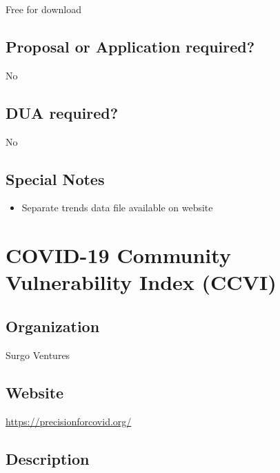 \documentclass[
]{book}
\providecommand{\tightlist}{%
  \setlength{\itemsep}{0pt}\setlength{\parskip}{0pt}}
\begin{document}
Free for download

\hypertarget{proposal-or-application-required-19}{%
\section{Proposal or Application required?}\label{proposal-or-application-required-19}}

No

\hypertarget{dua-required-19}{%
\section{DUA required?}\label{dua-required-19}}

No

\hypertarget{special-notes-19}{%
\section{Special Notes}\label{special-notes-19}}

\begin{itemize}
\tightlist
\item
  Separate trends data file available on website
\end{itemize}

\mainmatter

\hypertarget{covid-19-community-vulnerability-index-ccvi}{%
\chapter{COVID-19 Community Vulnerability Index (CCVI)}\label{covid-19-community-vulnerability-index-ccvi}}

\hypertarget{organization-20}{%
\section{Organization}\label{organization-20}}

Surgo Ventures

\hypertarget{website-20}{%
\section{Website}\label{website-20}}

\url{https://precisionforcovid.org/}

\hypertarget{description-20}{%
\section{Description}\label{description-20}}
\end{document}
